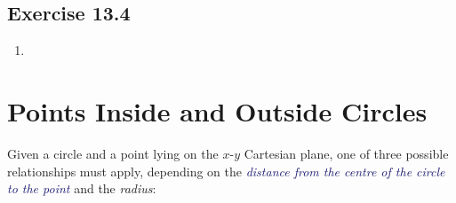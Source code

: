 \documentclass[
  11pt,
  openany]{book}
\begin{document}
\pagebreak

\subsection*{Exercise 13.4}\label{exercise-13.4}

\vspace{-0.3cm}

\begin{enumerate}
    \item
\end{enumerate}

\newpage

\section{Points Inside and Outside Circles}\label{points-inside-and-outside-circles}

\vspace{-0.5cm}

Given a circle and a point lying on the \(x\)-\(y\) Cartesian plane, one of three possible relationships must apply, depending on the \textcolor{MidnightBlue}{\textit{distance from the centre of the circle to the point}} and the \textit{radius}:

\vspace{-0.3cm}
\end{document}
